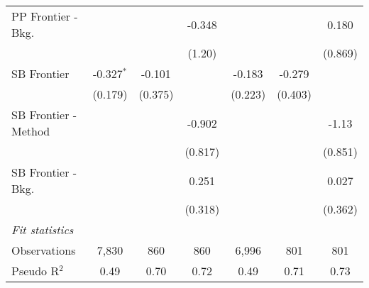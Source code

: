 \begin{tabular}{lcccccc}
   PP Frontier - Bkg.   &               &              & -0.348        &               &              & 0.180\\   
                        &               &              & (1.20)        &               &              & (0.869)\\   
   SB Frontier          & -0.327$^{*}$  & -0.101       &               & -0.183        & -0.279       &   \\   
                        & (0.179)       & (0.375)      &               & (0.223)       & (0.403)      &   \\   
   SB Frontier - Method &               &              & -0.902        &               &              & -1.13\\   
                        &               &              & (0.817)       &               &              & (0.851)\\   
   SB Frontier - Bkg.   &               &              & 0.251         &               &              & 0.027\\   
                        &               &              & (0.318)       &               &              & (0.362)\\   
   \midrule
   \emph{Fit statistics}\\
   Observations         & 7,830         & 860          & 860           & 6,996         & 801          & 801\\  
   Pseudo R$^2$         & 0.49          & 0.70         & 0.72          & 0.49          & 0.71         & 0.73\\  
   

\end{tabular}
